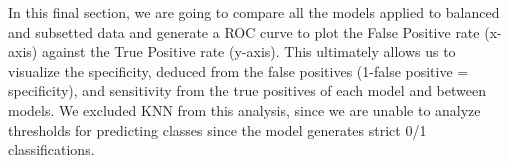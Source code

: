 \documentclass[
]{article}
\newenvironment{Shaded}{\begin{snugshade}}{\end{snugshade}}
\newcommand{\AttributeTok}[1]{\textcolor[rgb]{0.77,0.63,0.00}{#1}}
\newcommand{\CommentTok}[1]{\textcolor[rgb]{0.56,0.35,0.01}{\textit{#1}}}
\newcommand{\DecValTok}[1]{\textcolor[rgb]{0.00,0.00,0.81}{#1}}
\newcommand{\FunctionTok}[1]{\textcolor[rgb]{0.00,0.00,0.00}{#1}}
\newcommand{\NormalTok}[1]{#1}
\newcommand{\OtherTok}[1]{\textcolor[rgb]{0.56,0.35,0.01}{#1}}
\newcommand{\SpecialCharTok}[1]{\textcolor[rgb]{0.00,0.00,0.00}{#1}}
\newcommand{\StringTok}[1]{\textcolor[rgb]{0.31,0.60,0.02}{#1}}
\begin{document}
In this final section, we are going to compare all the models applied to
balanced and subsetted data and generate a ROC curve to plot the False
Positive rate (x-axis) against the True Positive rate (y-axis). This
ultimately allows us to visualize the specificity, deduced from the
false positives (1-false positive = specificity), and sensitivity from
the true positives of each model and between models. We excluded KNN
from this analysis, since we are unable to analyze thresholds for
predicting classes since the model generates strict 0/1 classifications.

\begin{Shaded}
\end{Shaded}
\end{document}
